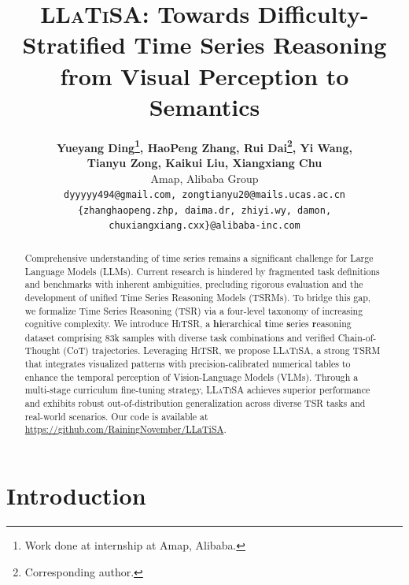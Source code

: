 \documentclass[11pt]{article}
\title{\textsc{LLaTiSA}: Towards Difficulty-Stratified Time Series Reasoning from Visual Perception to Semantics}
\author{
  \textbf{Yueyang Ding\thanks{Work done at internship at Amap, Alibaba.}, HaoPeng Zhang, Rui Dai\thanks{Corresponding author.}, Yi Wang,} \\
  \textbf{Tianyu Zong, Kaikui Liu, Xiangxiang Chu} \\
  Amap, Alibaba Group \\
  \texttt{dyyyyy494@gmail.com, zongtianyu20@mails.ucas.ac.cn} \\
  \texttt{\{zhanghaopeng.zhp, daima.dr, zhiyi.wy, damon, chuxiangxiang.cxx\}@alibaba-inc.com}
}
\begin{document}
\maketitle
\begin{abstract}
Comprehensive understanding of time series remains a significant challenge for Large Language Models (LLMs). Current research is hindered by fragmented task definitions and benchmarks with inherent ambiguities, precluding rigorous evaluation and the development of unified Time Series Reasoning Models (TSRMs). To bridge this gap, we formalize Time Series Reasoning (TSR) via a four-level taxonomy of increasing cognitive complexity. We introduce \textsc{HiTSR}, a \textbf{hi}erarchical \textbf{t}ime \textbf{s}eries \textbf{r}easoning dataset comprising 83k samples with diverse task combinations and verified Chain-of-Thought (CoT) trajectories. Leveraging \textsc{HiTSR}, we propose \textsc{LLaTiSA}, a strong TSRM that integrates visualized patterns with precision-calibrated numerical tables to enhance the temporal perception of Vision-Language Models (VLMs). Through a multi-stage curriculum fine-tuning strategy, \textsc{LLaTiSA} achieves superior performance and exhibits robust out-of-distribution generalization across diverse TSR tasks and real-world scenarios. Our code is available at \href{https://github.com/RainingNovember/LLaTiSA}{https://github.com/RainingNovember/LLaTiSA}.
\end{abstract}

\section{Introduction}

\end{document}
